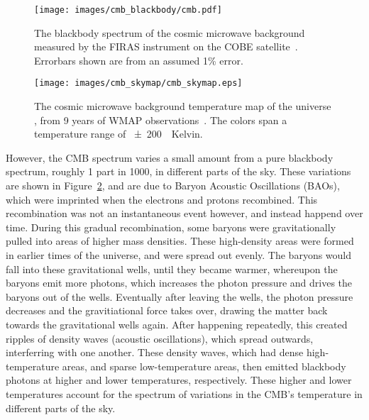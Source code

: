 \begin{figure}[t]
  \centering
  \texttt{[image: images/cmb\_blackbody/cmb.pdf]}
  \caption[Cosmic Microwave Background Blackbody]{
    The blackbody spectrum of the cosmic microwave background measured by the FIRAS instrument on the COBE satellite~\cite{mather1990}.
    Errorbars shown are from an assumed 1\% error.
  }
  \label{fig:cmb_black}
\end{figure}


\begin{figure}[t]
  \centering
  \texttt{[image: images/cmb\_skymap/cmb\_skymap.eps]}
  \caption[Cosmic Microwave Background Skymap]{
    The cosmic microwave background temperature map of the universe \cite{wmap_skymap}, from 9 years of WMAP observations~\cite{wmap9year}.
    The colors span a temperature range of \SI{\pm200}{\mu{}Kelvin}.
  }
  \label{fig:cmb}
\end{figure}

However, the CMB spectrum varies a small amount from a pure blackbody spectrum, roughly 1 part in 1000, in different parts of the sky.
These variations are shown in Figure~\ref{fig:cmb}, and are due to Baryon Acoustic Oscillations (BAOs), which were imprinted when the electrons and protons recombined.
This recombination was not an instantaneous event however, and instead happend over time.
During this gradual recombination, some baryons were gravitationally pulled into areas of higher mass densities.
These high-density areas were formed in earlier times of the universe, and were spread out evenly.
The baryons would fall into these gravitational wells, until they became warmer, whereupon the baryons emit more photons, which increases the photon pressure and drives the baryons out of the wells.
Eventually after leaving the wells, the photon pressure decreases and the gravitiational force takes over, drawing the matter back towards the gravitational wells again.
After happening repeatedly, this created ripples of density waves (acoustic oscillations), which spread outwards, interferring with one another.
These density waves, which had dense high-temperature areas, and sparse low-temperature areas, then emitted blackbody photons at higher and lower temperatures, respectively.
These higher and lower temperatures account for the spectrum of variations in the CMB's temperature in different parts of the sky.


